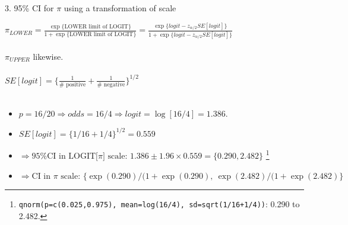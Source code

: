\documentclass[10pt,handout]{beamer}\usepackage[]{graphicx}\usepackage[]{color}
\begin{document}
\begin{frame}{3. 95\% CI for $\pi$ using a transformation of scale}
	\small
	
	$\pi _{LOWER} = \frac{\exp \{\textrm{LOWER limit of LOGIT}\}}{1 + \exp \{\textrm{LOWER limit of LOGIT}\}} 
	=\frac{\exp \{logit - z_{\alpha/2}SE[logit]\}}{1 + \exp \{logit - z_{\alpha/2}SE[logit]\}} $ \\ \ \\
	
	$\pi _{UPPER}$ likewise.  \\ \ \\
	
	$SE[logit] = \big\{ \frac{1}{\# \textrm{ positive} }
	+ \frac{1}{\# \textrm{ negative} }
	\big\}^{1/2}$ \\ \ \\
	
	
	
	\begin{itemize}
		\item $p = 16/20 \Rightarrow odds = 16/4 \Rightarrow  logit = \log[16/4] = 1.386.$ 
		
		\item $SE[logit] =\{1/16 + 1/4 \}^{1/2} = 0.559$ 
		
		\item $  \Rightarrow \textrm{95\% CI in LOGIT[}\pi] \textrm{ scale: } 1.386 \pm 1.96\times 0.559
		= \{0.290, 2.482\}$ \footnote{  
			\texttt{qnorm(p=c(0.025,0.975), mean=log(16/4), sd=sqrt(1/16+1/4))}: 0.290 to 2.482.}
		
		\item $ \Rightarrow \textrm{CI in } \pi \textrm{ scale: }  \{ \exp(0.290)/(1+\exp(0.290), \
		\exp(2.482)/(1+\exp(2.482) \}$ 
	\end{itemize}
	
\end{frame}
\end{document}
